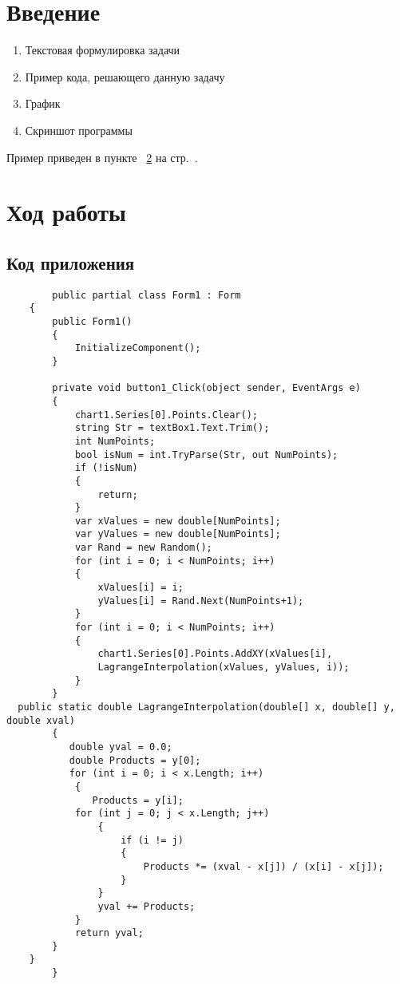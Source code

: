 \documentclass[12pt,a4paper]{scrartcl}
\begin{document}
	\section{Введение}
	\label{sec:intro}
	
	\begin{enumerate}
		\item Текстовая формулировка задачи
		\item Пример кода, решающего данную задачу
		\item График
		\item Скриншот программы
	\end{enumerate}
	
	Пример приведен в пункте ~\ref{sec:exp} на стр.~\pageref{sec:exp}.
	
	\section{Ход работы}
	\label{sec:exp}
	
	\subsection{Код приложения}
	\label{sec:exp:code}
	\begin{verbatim}
		public partial class Form1 : Form
    {
        public Form1()
        {
            InitializeComponent();
        }

        private void button1_Click(object sender, EventArgs e)
        {
            chart1.Series[0].Points.Clear();
            string Str = textBox1.Text.Trim();
            int NumPoints;
            bool isNum = int.TryParse(Str, out NumPoints);
            if (!isNum)
            {
                return;
            }
            var xValues = new double[NumPoints];
            var yValues = new double[NumPoints];
            var Rand = new Random();
            for (int i = 0; i < NumPoints; i++)
            {
                xValues[i] = i;
                yValues[i] = Rand.Next(NumPoints+1);
            }
            for (int i = 0; i < NumPoints; i++)
            {
                chart1.Series[0].Points.AddXY(xValues[i],
                LagrangeInterpolation(xValues, yValues, i));
            }
        }
  public static double LagrangeInterpolation(double[] x, double[] y, double xval)
        {
           double yval = 0.0;
           double Products = y[0];
           for (int i = 0; i < x.Length; i++)
            {
               Products = y[i];
            for (int j = 0; j < x.Length; j++)
                {
                    if (i != j)
                    {
                        Products *= (xval - x[j]) / (x[i] - x[j]);
                    }
                }
                yval += Products;
            }
            return yval;
        }
    }
	    }
	    
	\end{verbatim}
	
\end{document}
